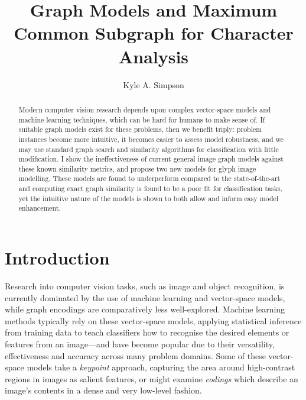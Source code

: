 \documentclass{mpaper}
\begin{document}
\title{Graph Models and Maximum Common Subgraph for Character Analysis}
\author{Kyle A. Simpson}

\maketitle
\begin{abstract}
Modern computer vision research depends upon complex vector-space models and machine learning techniques, which can be hard for humans to make sense of.
If suitable graph models exist for these problems, then we benefit triply: problem instances become more intuitive, it becomes easier to assess model robustness, and we may use standard graph search and similarity algorithms for classification with little modification.
I show the ineffectiveness of current general image graph models against these known similarity metrics, and propose two new models for glyph image modelling.
These models are found to underperform compared to the state-of-the-art and computing exact graph similarity is found to be a poor fit for classification tasks, yet the intuitive nature of the models is shown to both allow and inform easy model enhancement.
\end{abstract}

\section{Introduction}
\label{sec:introduction}

Research into computer vision tasks, such as image and object recognition, is currently dominated by the use of machine learning and vector-space models, while graph encodings are comparatively less well-explored.
Machine learning methods typically rely on these vector-space models, applying statistical inference from training data to teach classifiers how to recognise the desired elements or features from an image---and have become popular due to their versatility, effectiveness and accuracy across many problem domains.
Some of these vector-space models take a \emph{keypoint} approach, capturing the area around high-contrast regions in images as salient features, or might examine \emph{codings} which describe an image's contents in a dense and very low-level fashion.
\end{document}

